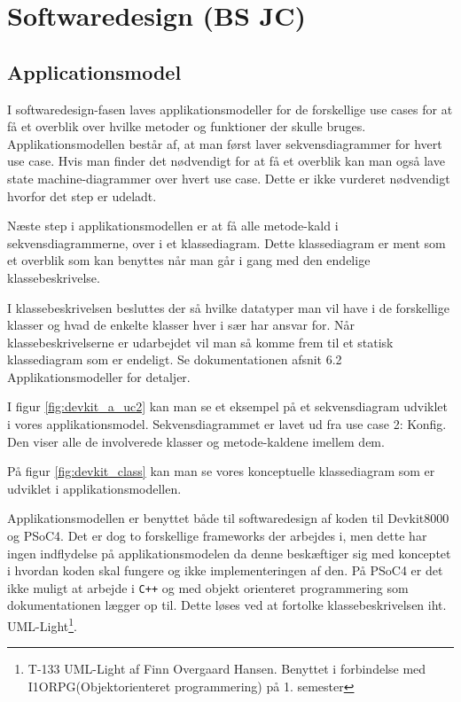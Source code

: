\section{Softwaredesign (BS JC)}

\subsection{Applicationsmodel}
I softwaredesign-fasen laves applikationsmodeller for de forskellige use cases for at få et overblik over hvilke metoder og funktioner der skulle bruges. Applikationsmodellen består af, at man først laver sekvensdiagrammer for hvert use case. Hvis man finder det nødvendigt for at få et overblik kan man også lave state machine-diagrammer over hvert use case. Dette er ikke vurderet nødvendigt hvorfor det step er udeladt.

Næste step i applikationsmodellen er at få alle metode-kald i sekvensdiagrammerne, over i et klassediagram. Dette klassediagram er ment som et overblik som kan benyttes når man går i gang med den endelige klassebeskrivelse.

I klassebeskrivelsen besluttes der så hvilke datatyper man vil have i de forskellige klasser og hvad de enkelte klasser hver i sær har ansvar for. Når klassebeskrivelserne er udarbejdet vil man så komme frem til et statisk klassediagram som er endeligt. Se dokumentationen afsnit 6.2 Applikationsmodeller for detaljer.


I figur \ref{fig:devkit_a_uc2} kan man se et eksempel på et sekvensdiagram udviklet i vores applikationsmodel. Sekvensdiagrammet er lavet ud fra use case 2: Konfig. Den viser alle de involverede klasser og metode-kaldene imellem dem.

På figur \ref{fig:devkit_class} kan man se vores konceptuelle klassediagram som er udviklet i applikationsmodellen.


Applikationsmodellen er benyttet både til softwaredesign af koden til Devkit8000 og PSoC4. Det er dog to forskellige frameworks der arbejdes i, men dette har ingen indflydelse på applikationsmodelen da denne beskæftiger sig med konceptet i hvordan koden skal fungere og ikke implementeringen af den. På PSoC4 er det ikke muligt at arbejde i \verb-C++- og med objekt orienteret programmering som dokumentationen lægger op til. Dette løses ved at fortolke klassebeskrivelsen iht. UML-Light\footnote{T-133 UML-Light af Finn Overgaard Hansen. Benyttet i forbindelse med I1ORPG(Objektorienteret programmering) på 1. semester}.

